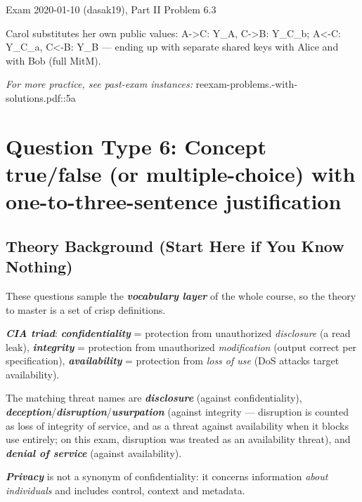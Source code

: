 \documentclass[12pt, a4paper]{article}
\newcommand{\term}[1]{\textbf{\textit{#1}}}        %
\begin{document}
\begin{practicebox}{Exam 2020-01-10 (dasak19), Part II Problem 6.3}
\begin{answerbox}
Carol substitutes her own public values: A->C: Y\_A, C->B: Y\_{C\_b}; A<-C: Y\_{C\_a}, C<-B: Y\_B --- ending up with separate shared keys with Alice and with Bob (full MitM).
\end{answerbox}
\end{practicebox}

\textit{For more practice, see past-exam instances:} reexam-problems.-with-solutions.pdf::5a

\section{Question Type 6: Concept true/false (or multiple-choice) with one-to-three-sentence justification}

\subsection*{Theory Background (Start Here if You Know Nothing)}

These questions sample the \term{vocabulary layer} of the whole course, so the theory to master is a set of crisp definitions.

\term{CIA triad}: \term{confidentiality} = protection from unauthorized \emph{disclosure} (a read leak), \term{integrity} = protection from unauthorized \emph{modification} (output correct per specification), \term{availability} = protection from \emph{loss of use} (DoS attacks target availability).

The matching threat names are \term{disclosure} (against confidentiality), \term{deception}/\term{disruption}/\term{usurpation} (against integrity --- disruption is counted as loss of integrity of service, and as a threat against availability when it blocks use entirely; on this exam, disruption was treated as an availability threat), and \term{denial of service} (against availability).

\term{Privacy} is not a synonym of confidentiality: it concerns information \emph{about individuals} and includes control, context and metadata.
\end{document}
